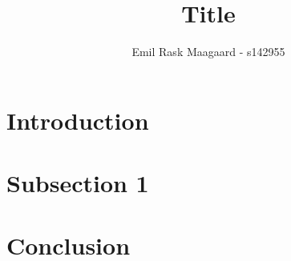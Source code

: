 \documentclass{dtu_report_columns}
\title{Title}
\author{Emil Rask Maagaard - s142955}
\begin{document}
\maketitle{}




\section*{Introduction}



\section*{Subsection 1}


\section*{Conclusion}



% 
\end{document}
